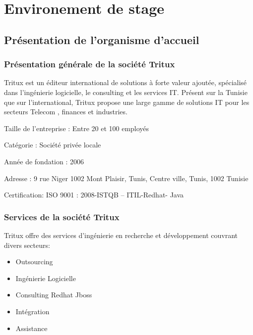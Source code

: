 \documentclass[../rapportdestage.tex]{subfiles}
\begin{document}



\section{Environement de stage}
	\subsection{Présentation de l’organisme d’accueil}
		\subsubsection{Présentation générale de la société Tritux}

 Tritux est un éditeur international de solutions à forte valeur ajoutée, spécialisé dans l’ingénierie logicielle, le consulting et les services IT. Présent sur la Tunisie que sur l’international, Tritux propose  une large gamme de solutions IT pour les secteurs Telecom , finances et industries.

Taille de l'entreprise :    Entre 20 et 100 employés

Catégorie :    Société privée locale

Année de fondation :    2006

Adresse :  9 rue Niger 1002 Mont Plaisir, Tunis, Centre ville, Tunis, 1002 Tunisie 

Certification: ISO 9001 : 2008-ISTQB – ITIL-Redhat- Java




			 \subsubsection{Services de la société Tritux}
			 Tritux offre des services d’ingénierie en recherche et développement couvrant divers secteurs:
\begin{spacing}{1}			 
\begin{itemize}
	\item Outsourcing
	\item Ingénierie Logicielle
	\item Consulting Redhat Jboss
	\item Intégration
	\item Assistance
\end{itemize}
\end{spacing}
\end{document}
